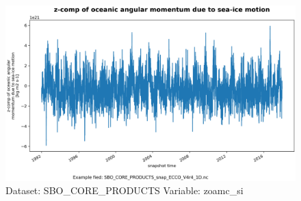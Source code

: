 \begin{figure}[H]
\centering
\includegraphics[scale=0.55]{../images/plots/oneD_plots/SBO_Core_Products/zoamc_si.png}
\caption{Dataset: SBO\_CORE\_PRODUCTS Variable: zoamc\_si}
\label{tab:table-SBO_CORE_PRODUCTS_zoamc_si-Plot}
\end{figure}
\pagebreak
